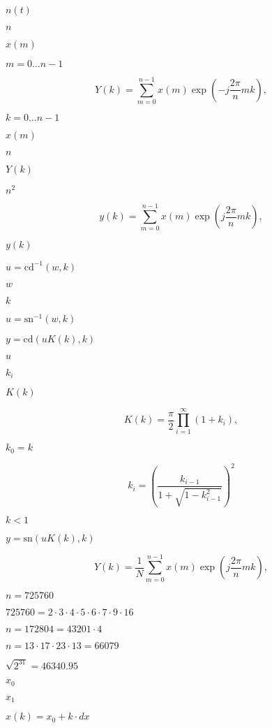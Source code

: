\documentclass{article}
\begin{document}
$n(t)$
\pagebreak

$ n $
\pagebreak

$ x(m) $
\pagebreak

$ m = 0 \ldots n-1 $
\pagebreak

\[ Y(k) = \sum_{m = 0}^{n-1} x(m) \exp \left( -j \frac{2\pi}{n} m k \right), \]
\pagebreak

$ k = 0 \ldots n-1 $
\pagebreak

$x(m)$
\pagebreak

$n$
\pagebreak

$Y(k)$
\pagebreak

$ n^2 $
\pagebreak

\[ y(k) = \sum_{m = 0}^{n-1} x(m) \exp \left( j \frac{2\pi}{n} m k \right), \]
\pagebreak

$y(k)$
\pagebreak

$ u = \textrm{cd}^{-1}(w, k)$
\pagebreak

$ w $
\pagebreak

$ k $
\pagebreak

$ u = \textrm{sn}^{-1}(w, k)$
\pagebreak

$ y = \textrm{cd}(u K(k), k)$
\pagebreak

$ u $
\pagebreak

$ k_i $
\pagebreak

$ K(k) $
\pagebreak

\[ K(k) = \frac{\pi}{2} \prod_{i = 1}^{\infty}(1+k_i), \]
\pagebreak

$ k_0 = k$
\pagebreak

\[ k_i = \left( \frac{k_{i-1}} { 1+\sqrt{1-k_{i-1}^2} } \right)^2 \]
\pagebreak

$ k<1 $
\pagebreak

$ y = \textrm{sn}(u K(k), k)$
\pagebreak

\[ Y(k) = \frac{1}{N} \sum_{m = 0}^{n-1} x(m) \exp \left( j \frac{2\pi}{n} m k \right), \]
\pagebreak

$ n = 725760 $
\pagebreak

$725760 = 2 \cdot 3 \cdot 4 \cdot 5 \cdot 6 \cdot 7 \cdot 9 \cdot 16 $
\pagebreak

$ n = 172804 = 43201 \cdot 4 $
\pagebreak

$ n = 13 \cdot 17 \cdot 23 \cdot 13 = 66079 $
\pagebreak

$\sqrt{2^{31}} = 46340.95$
\pagebreak

$x_0$
\pagebreak

$x_1$
\pagebreak

$x(k) = x_0 + k \cdot dx$
\pagebreak
\end{document}
